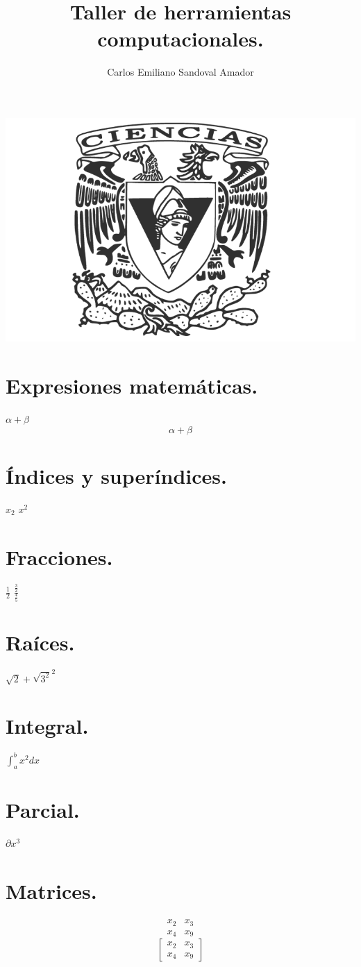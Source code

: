 \documentclass{article}
\title{\Huge Taller de herramientas computacionales.}
\author{Carlos Emiliano Sandoval Amador}
\begin{document}
	\maketitle
	\begin{center}
		\includegraphics[scale=0.40]{ciencias.png}
	\end{center}
	\section*{Expresiones matemáticas.}
	$\alpha + \beta$ \\
	\[\alpha + \beta\]
	\section*{Índices y superíndices.}
	$x_{2}$ $x^{2}$
	\section*{Fracciones.}
	$\frac{1}{2}$
	$\frac{\frac{3}{2}}{\frac{4}{5}}$
	\section*{Raíces.}
	$\sqrt{2} + \sqrt{3^2}^2$
	\section*{Integral.}
	$\int_{a}^{b}x^2dx$
	\section*{Parcial.}
	$\partial x^3$
	\section*{Matrices.}
\[
	\begin{matrix}
		x_{2} & x_{3} \\
		x_{4} & x_{9}
	\end{matrix}
\]
\[
	\begin{bmatrix}
		x_{2} & x_{3} \\
		x_{4} & x_{9}
	\end{bmatrix}	
\]
\end{document}
